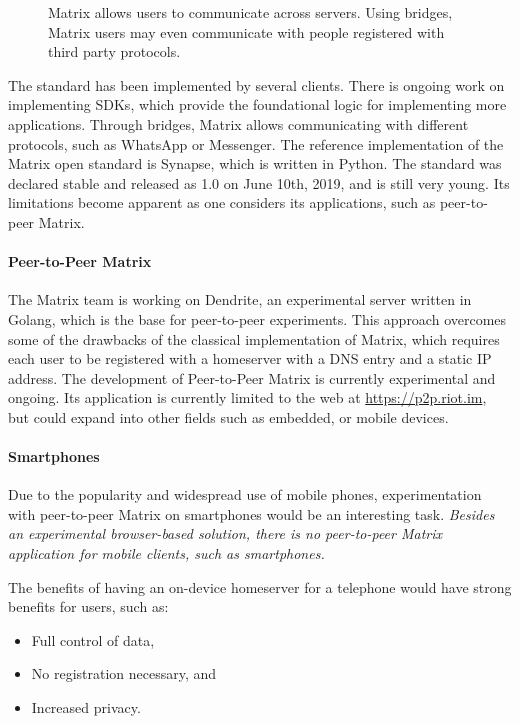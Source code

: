 \begin{figure}[h]
    
    \caption{Matrix allows users to communicate across servers. Using bridges, Matrix users may even communicate with people registered with third party protocols.}
    \label{fig:matrix_structure}
\end{figure}

The standard has been implemented by several clients\cite{matrix_org_clients}.
There is ongoing work on implementing SDKs\cite{matrix_org_sdks}, which provide the foundational logic for implementing more applications.
Through bridges, Matrix allows communicating with different protocols\cite{matrix_org_bridges}, such as WhatsApp or Messenger.
The reference implementation of the Matrix open standard is Synapse\cite{matrix_org_synapse}, which is written in Python.
The standard was declared stable and released as 1.0 on June 10th, 2019\cite{matrix_org_spec}, and is still very young.
Its limitations become apparent as one considers its applications, such as peer-to-peer Matrix.


\paragraph{Peer-to-Peer Matrix}
The Matrix team is working on Dendrite\cite{matrix_org_dendrite}, an experimental server written in Golang, which is the base for peer-to-peer experiments.
This approach overcomes some of the drawbacks of the classical implementation of Matrix, which requires each user to be registered with a homeserver with a DNS entry and a static IP address.
The development of Peer-to-Peer Matrix is currently experimental and ongoing.
Its application is currently limited to the web at \url{https://p2p.riot.im}, but could expand into other fields such as embedded, or mobile devices.

\paragraph{Smartphones}
Due to the popularity and widespread use of mobile phones, experimentation with peer-to-peer Matrix on smartphones would be an interesting task.
\textit{Besides an experimental browser-based solution\cite{fosdem_event_p2p_matrix}, there is no peer-to-peer Matrix application for mobile clients, such as smartphones.}

The benefits of having an on-device homeserver for a telephone would have strong benefits for users, such as:
\begin{itemize}
    \item Full control of data,
    \item No registration necessary, and
    \item Increased privacy.
\end{itemize}

